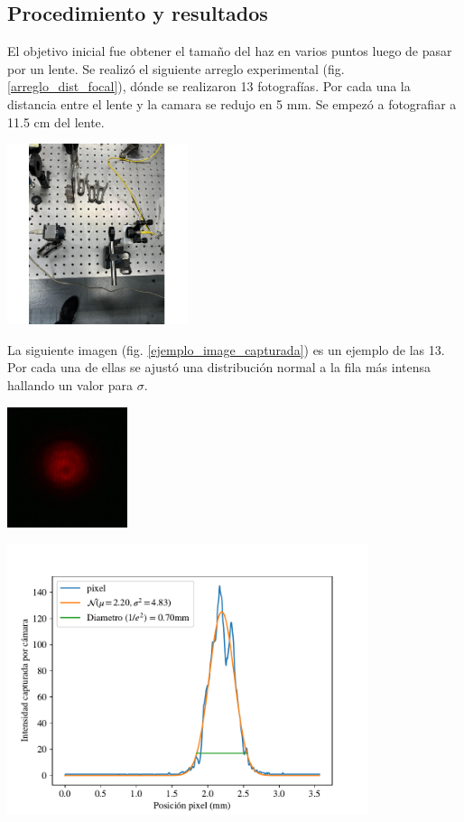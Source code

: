 \documentclass[onecolumn]{article}
\begin{document}
		\subsection{Procedimiento y resultados}
		El objetivo inicial fue obtener el tamaño del haz en varios puntos luego de pasar por un lente. Se realizó el siguiente arreglo experimental (fig. \ref{arreglo_dist_focal}), dónde se realizaron 13 fotografías. Por cada una la distancia entre el lente y la camara se redujo en 5 mm. Se empezó a fotografiar a 11.5 cm del lente.

		\begin{center}
			\includegraphics[width=150pt]{img/dist_focal/arreglo.pdf}
			\label{arreglo_dist_focal}
		\end{center}

		La siguiente imagen (fig. \ref{ejemplo_image_capturada}) es un ejemplo de las 13. Por cada una de ellas se ajustó una distribución normal a la fila más intensa hallando un valor para $\sigma$.
		\begin{center}
			\includegraphics[width=100pt]{img/dist_focal/image_sample.pdf}
			\label{ejemplo_image_capturada}
		\end{center}

		\begin{center}
			\includegraphics[width=300pt]{img/dist_focal/plot_sample.pdf}
			\label{ejemplo_ajuste}
		\end{center}
\end{document}

